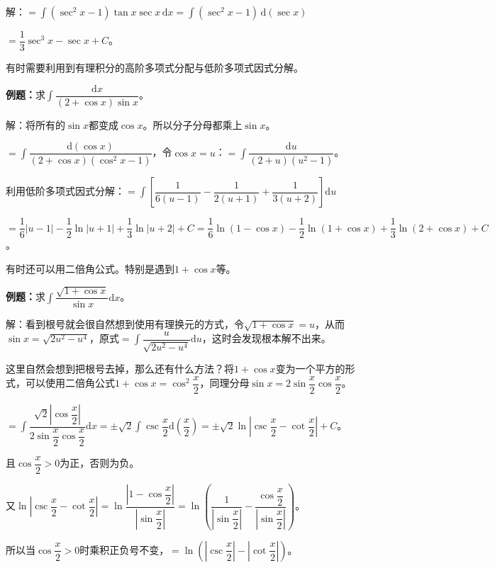 \documentclass[UTF8, 12pt]{ctexart}
\begin{document}
解：$=\displaystyle{\int(\sec^2x-1)}\tan x\sec x\,\textrm{d}x=\displaystyle{\int(\sec^2x-1)}\,\textrm{d}(\sec x)$

$=\dfrac{1}{3}\sec^3x-\sec x+C$。

有时需要利用到有理积分的高阶多项式分配与低阶多项式因式分解。

\textbf{例题：}求$\displaystyle{\int\dfrac{\textrm{d}x}{(2+\cos x)\sin x}}$。\medskip

解：将所有的$\sin x$都变成$\cos x$。所以分子分母都乘上$\sin x$。

$=\displaystyle{\int\dfrac{\textrm{d}(\cos x)}{(2+\cos x)(\cos^2x-1)}}$，令$\cos x=u$：$=\displaystyle{\int\dfrac{\textrm{d}u}{(2+u)(u^2-1)}}$。

利用低阶多项式因式分解：$=\displaystyle{\int\left[\dfrac{1}{6(u-1)}-\dfrac{1}{2(u+1)}+\dfrac{1}{3(u+2)}\right]\textrm{d}u}$

$=\dfrac{1}{6}\vert u-1\vert-\dfrac{1}{2}\ln\vert u+1\vert+\dfrac{1}{3}\ln\vert u+2\vert+C=\dfrac{1}{6}\ln(1-\cos x)-\dfrac{1}{2}\ln(1+\cos x)+\dfrac{1}{3}\ln(2+\cos x)+C$。

有时还可以用二倍角公式。特别是遇到$1+\cos x$等。\medskip

\textbf{例题：}求$\displaystyle{\int\dfrac{\sqrt{1+\cos x}}{\sin x}\textrm{d}x}$。

解：看到根号就会很自然想到使用有理换元的方式，令$\sqrt{1+\cos x}=u$，从而$\sin x=\sqrt{2u^2-u^4}$，原式$=\displaystyle{\int\dfrac{u}{\sqrt{2u^2-u^4}}\textrm{d}u}$，这时会发现根本解不出来。

这里自然会想到把根号去掉，那么还有什么方法？将$1+\cos x$变为一个平方的形式，可以使用二倍角公式$1+\cos x=\cos^2\dfrac{x}{2}$，同理分母$\sin x=2\sin\dfrac{x}{2}\cos\dfrac{x}{2}$。

$=\displaystyle{\int\dfrac{\sqrt{2}\left\vert\cos\dfrac{x}{2}\right\vert}{2\sin\dfrac{x}{2}\cos\dfrac{x}{2}}\textrm{d}x=\pm\sqrt{2}\int\csc\dfrac{x}{2}\textrm{d}\left(\dfrac{x}{2}\right)=\pm\sqrt{2}\ln\left\vert\csc\dfrac{x}{2}-\cot\dfrac{x}{2}\right\vert+C}$。

且$\cos\dfrac{x}{2}>0$为正，否则为负。

又$\ln\left\vert\csc\dfrac{x}{2}-\cot\dfrac{x}{2}\right\vert=\ln\dfrac{\left\vert1-\cos\dfrac{x}{2}\right\vert}{\left\vert\sin\dfrac{x}{2}\right\vert}=\ln\left(\dfrac{1}{\left\vert\sin\dfrac{x}{2}\right\vert}-\dfrac{\cos\dfrac{x}{2}}{\left\vert\sin\dfrac{x}{2}\right\vert}\right)$。\medskip

所以当$\cos\dfrac{x}{2}>0$时乘积正负号不变，$=\ln\left(\left\vert\csc\dfrac{x}{2}\right\vert-\left\vert\cot\dfrac{x}{2}\right\vert\right)$。
\end{document}
